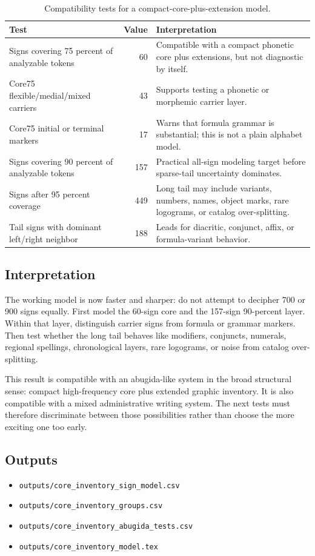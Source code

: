 \begin{table}[htbp]
\centering
\begin{tabular}{p{}r p{}}
\toprule
\textbf{Test} & \textbf{Value} & \textbf{Interpretation} \\
\midrule
Signs covering 75 percent of analyzable tokens & 60 & Compatible with a compact phonetic core plus extensions, but not diagnostic by itself. \\
Core75 flexible/medial/mixed carriers & 43 & Supports testing a phonetic or morphemic carrier layer. \\
Core75 initial or terminal markers & 17 & Warns that formula grammar is substantial; this is not a plain alphabet model. \\
Signs covering 90 percent of analyzable tokens & 157 & Practical all-sign modeling target before sparse-tail uncertainty dominates. \\
Signs after 95 percent coverage & 449 & Long tail may include variants, numbers, names, object marks, rare logograms, or catalog over-splitting. \\
Tail signs with dominant left/right neighbor & 188 & Leads for diacritic, conjunct, affix, or formula-variant behavior. \\
\bottomrule
\end{tabular}
\caption{Compatibility tests for a compact-core-plus-extension model.}
\label{tab:abugida-scale-tests}
\end{table}

\subsection{Interpretation}

The working model is now faster and sharper: do not attempt to decipher 700 or 900 signs equally. First model the 60-sign core and the 157-sign 90-percent layer. Within that layer, distinguish carrier signs from formula or grammar markers. Then test whether the long tail behaves like modifiers, conjuncts, numerals, regional spellings, chronological layers, rare logograms, or noise from catalog over-splitting.

This result is compatible with an abugida-like system in the broad structural sense: compact high-frequency core plus extended graphic inventory. It is also compatible with a mixed administrative writing system. The next tests must therefore discriminate between those possibilities rather than choose the more exciting one too early.

\subsection{Outputs}

\begin{itemize}
  \item \texttt{outputs/core\_inventory\_sign\_model.csv}
  \item \texttt{outputs/core\_inventory\_groups.csv}
  \item \texttt{outputs/core\_inventory\_abugida\_tests.csv}
  \item \texttt{outputs/core\_inventory\_model.tex}
\end{itemize}
